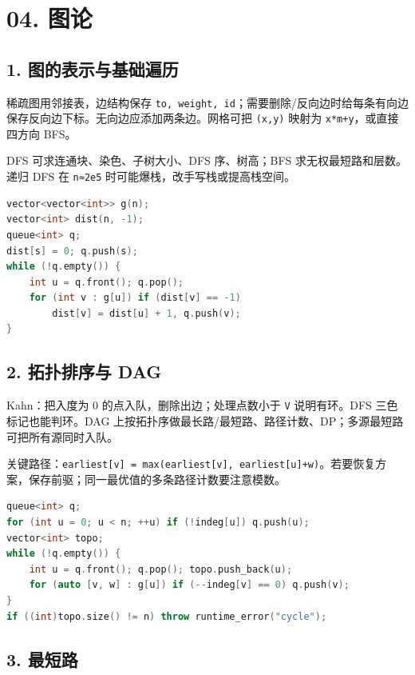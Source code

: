 \chapter{04. 图论}\label{ux56feux8bba}

\section{1. 图的表示与基础遍历}\label{ux56feux7684ux8868ux793aux4e0eux57faux7840ux904dux5386}

稀疏图用邻接表，边结构保存 \passthrough{\lstinline!to, weight, id!}；需要删除/反向边时给每条有向边保存反向边下标。无向边应添加两条边。网格可把 \passthrough{\lstinline!(x,y)!} 映射为 \passthrough{\lstinline!x*m+y!}，或直接四方向 BFS。

DFS 可求连通块、染色、子树大小、DFS 序、树高；BFS 求无权最短路和层数。递归 DFS 在 \passthrough{\lstinline!n≈2e5!} 时可能爆栈，改手写栈或提高栈空间。

\begin{lstlisting}[language={C++}]
vector<vector<int>> g(n);
vector<int> dist(n, -1);
queue<int> q;
dist[s] = 0; q.push(s);
while (!q.empty()) {
    int u = q.front(); q.pop();
    for (int v : g[u]) if (dist[v] == -1)
        dist[v] = dist[u] + 1, q.push(v);
}
\end{lstlisting}

\section{2. 拓扑排序与 DAG}\label{ux62d3ux6251ux6392ux5e8fux4e0e-dag}

Kahn：把入度为 0 的点入队，删除出边；处理点数小于 \passthrough{\lstinline!V!} 说明有环。DFS 三色标记也能判环。DAG 上按拓扑序做最长路/最短路、路径计数、DP；多源最短路可把所有源同时入队。

关键路径：\passthrough{\lstinline!earliest[v] = max(earliest[v], earliest[u]+w)!}。若要恢复方案，保存前驱；同一最优值的多条路径计数要注意模数。

\begin{lstlisting}[language={C++}]
queue<int> q;
for (int u = 0; u < n; ++u) if (!indeg[u]) q.push(u);
vector<int> topo;
while (!q.empty()) {
    int u = q.front(); q.pop(); topo.push_back(u);
    for (auto [v, w] : g[u]) if (--indeg[v] == 0) q.push(v);
}
if ((int)topo.size() != n) throw runtime_error("cycle");
\end{lstlisting}

\section{3. 最短路}\label{ux6700ux77edux8def}

